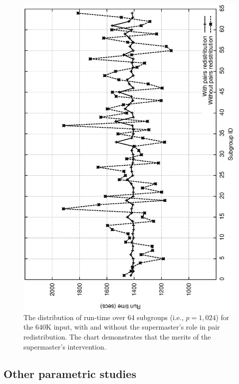 \documentclass[10pt,journal,letterpaper,compsoc]{IEEEtran}
\begin{document}
\begin{figure}[tb]
\centerline{
            \includegraphics[angle=-90, scale=0.33]{subgroups.eps}
}
\caption{
The distribution of run-time over 64 subgroups (i.e., $p=1,024$) for the 640K input, with and without the supermaster's role in pair redistribution. The chart demonstrates that the merits of the supermaster's intervention.
}
\label{figSPvalue}
\end{figure}



\subsection{Other parametric studies}
\label{secParameters}
\end{document}
